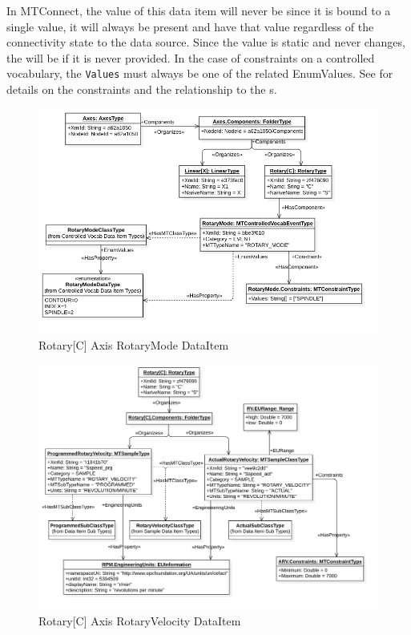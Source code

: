 In MTConnect, the value of this data item will never be  since it is bound to a single value, it will always be present and have that value regardless of the connectivity state to the data source. Since the value is static and never changes, the  will be  if it is never provided. In the case of constraints on a controlled vocabulary, the \texttt{Values} must always be one of the related EnumValues. See \cite{MTCPart2} for details on the constraints and the relationship to the s.

\begin{figure}[ht]
  \centering
  \includegraphics[width=1.0\textwidth]{diagrams/mtconnect-mapping/rotary-c-rotary-mode.png}
  \caption{Rotary[C] Axis RotaryMode DataItem}
  \label{fig:rotary-c-rotary-mode}
\end{figure}

\FloatBarrier

\begin{figure}[ht]
  \centering
  \includegraphics[width=1.0\textwidth]{diagrams/mtconnect-mapping/rotary-c-rotary-velocity.png}
  \caption{Rotary[C] Axis RotaryVelocity DataItem}
  \label{fig:rotary-c-rotary-velocity}
\end{figure}

